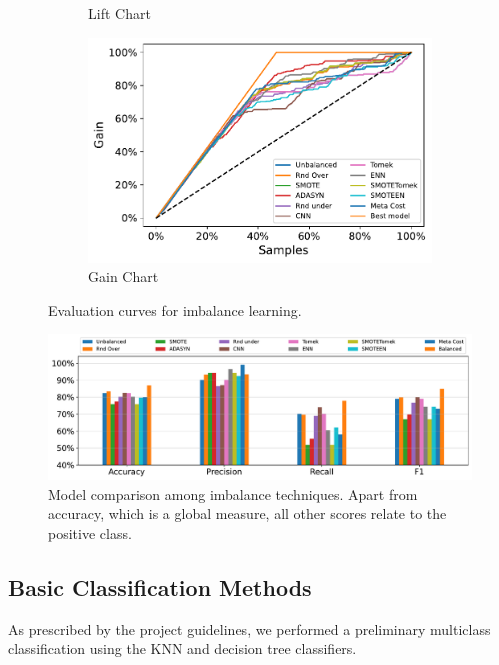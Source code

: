 \documentclass[10pt, a4paper, twocolumn]{article}
\begin{document}
\begin{figure}
\begin{subfigure}[t]{0.49\linewidth}
        \caption{Lift Chart}
        \label{fig:imblift}
    \end{subfigure}
    \hfill%
    \begin{subfigure}[t]{0.49\columnwidth}
        \includegraphics[width=\linewidth]{immagini simone/imb_gain_comparison.pdf}
        \caption{Gain Chart}
        \label{fig:imbgain}
    \end{subfigure}
    \caption{Evaluation curves for imbalance learning.}
    \label{fig:imb_curves}
\end{figure}

\begin{figure}
    \centering
    \includegraphics[width=\columnwidth]{immagini simone/imb_score_comparison.pdf}
    \caption{Model comparison among imbalance techniques. Apart from accuracy, which is a global measure, all other scores relate to the positive class.}
    \label{fig:imb_comparison}
\end{figure}

\subsection{Basic Classification Methods}

As prescribed by the project guidelines, we performed a preliminary multiclass classification using the KNN and decision tree classifiers. 
\end{document}
